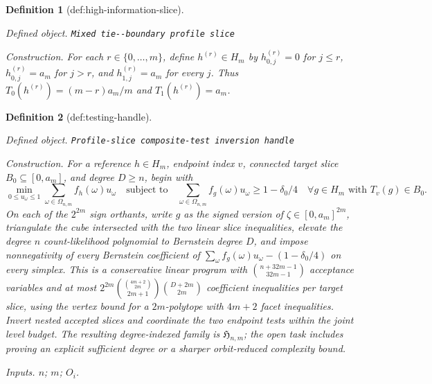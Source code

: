 \documentclass{article}
\newtheorem{definition}{Definition}
\begin{document}
\begin{definition}[def:high-information-slice]\label{def:high-information-slice}
\par\smallskip\noindent\emph{Defined object.} \texttt{Mixed tie-\allowbreak{}-\allowbreak{}boundary profile slice}
\par\smallskip\noindent\emph{Construction.} For each \(r\in\{0,\ldots,m\}\), define \(h^{(r)}\in H_m\) by \(h^{(r)}_{0,j}=0\) for \(j\le r\), \(h^{(r)}_{0,j}=a_m\) for \(j>r\), and \(h^{(r)}_{1,j}=a_m\) for every \(j\). Thus \(T_0(h^{(r)})=(m-r)a_m/m\) and \(T_1(h^{(r)})=a_m\).
\end{definition}

\begin{definition}[def:testing-handle]\label{def:testing-handle}
\par\smallskip\noindent\emph{Defined object.} \texttt{Profile-\allowbreak{}slice composite-\allowbreak{}test inversion handle}
\par\smallskip\noindent\emph{Construction.} For a reference \(h\in H_m\), endpoint index \(v\), connected target slice \(B_0\subseteq[0,a_m]\), and degree \(D\ge n\), begin with \[\min_{0\le u_{\omega}\le1}\sum_{\omega\in\Omega_{n,m}}f_h(\omega)u_{\omega}\quad\text{subject to}\quad\sum_{\omega\in\Omega_{n,m}}f_g(\omega)u_{\omega}\ge1-\delta_0/4\quad\forall g\in H_m\text{ with }T_v(g)\in B_0.\] On each of the \(2^{2m}\) sign orthants, write \(g\) as the signed version of \(\zeta\in[0,a_m]^{2m}\), triangulate the cube intersected with the two linear slice inequalities, elevate the degree \(n\) count-likelihood polynomial to Bernstein degree \(D\), and impose nonnegativity of every Bernstein coefficient of \(\sum_{\omega}f_g(\omega)u_{\omega}-(1-\delta_0/4)\) on every simplex. This is a conservative linear program with \(\binom{n+32m-1}{32m-1}\) acceptance variables and at most \(2^{2m}\binom{\binom{4m+2}{2m}}{2m+1}\binom{D+2m}{2m}\) coefficient inequalities per target slice, using the vertex bound for a \(2m\)-polytope with \(4m+2\) facet inequalities. Invert nested accepted slices and coordinate the two endpoint tests within the joint level budget. The resulting degree-indexed family is \(\mathfrak H_{n,m}\); the open task includes proving an explicit sufficient degree or a sharper orbit-reduced complexity bound.
\par\smallskip\noindent\emph{Inputs.} \(n\); \(m\); \(O_i\).
\end{definition}
\end{document}

